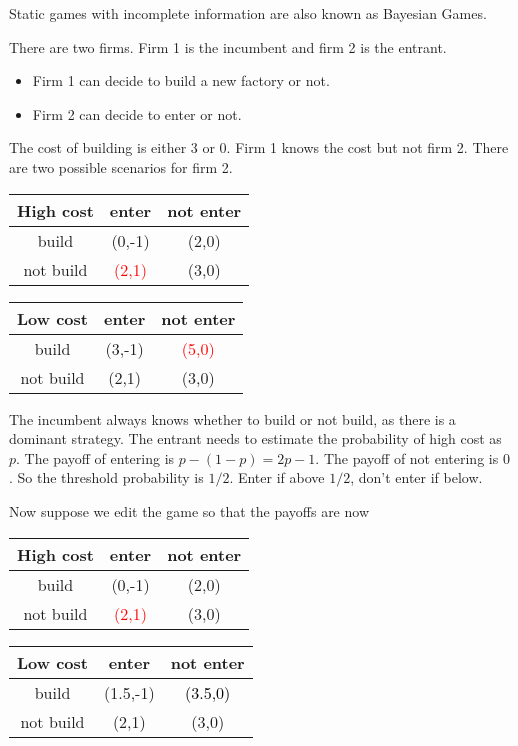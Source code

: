 Static games with incomplete information are also known as Bayesian Games.
\begin{aexample}{}{}
    There are two firms. Firm 1 is the incumbent and firm 2 is the entrant.
    \begin{itemize}
        \item Firm 1 can decide to build a new factory or not.
        \item Firm 2 can decide to enter or not.
    \end{itemize}
    The cost of building is either 3 or 0. Firm 1 knows the cost but not firm 2. There are two possible scenarios for firm 2.
    \begin{center}
        \begin{tabular}{|c|c c|}
            \hline High cost & enter & not enter \\
            \hline 
            build & (0,-1) & (2,0)\\
            \hline
            not build & \textcolor{red}{(2,1)} & (3,0)\\\hline
        \end{tabular} 
        \linebreak[3pt]
        
        \begin{tabular}{|c|c c|}
            \hline Low cost & enter & not enter \\
            \hline 
            build & (3,-1) & \textcolor{red}{(5,0)}\\
            \hline
            not build & (2,1) & (3,0)\\\hline
        \end{tabular}
    \end{center}
\end{aexample}
The incumbent always knows whether to build or not build, as there is a dominant strategy. The entrant needs to estimate the probability of high cost as $p$.
The payoff of entering is $p-(1-p)=2p-1$. The payoff of not entering is $0$. So the threshold probability is $1/2$. Enter if above $1/2$, don't enter if below.

Now suppose we edit the game so that the payoffs are now 
\begin{center}
    \begin{tabular}{|c|c c|}
        \hline High cost & enter & not enter \\
        \hline 
        build & (0,-1) & (2,0)\\
        \hline
        not build & \textcolor{red}{(2,1)} & (3,0)\\\hline
    \end{tabular} 
    \linebreak[3pt]
    
    \begin{tabular}{|c|c c|}
        \hline Low cost & enter & not enter \\
        \hline 
        build & (1.5,-1) & \textcolor{black}{(3.5,0)}\\
        \hline
        not build & (2,1) & (3,0)\\\hline
    \end{tabular}
\end{center}

